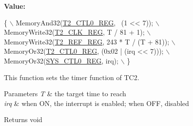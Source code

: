 {\bfseries Value\+:}
\begin{DoxyCode}
\{                                                  \(\backslash\)
        MemoryAnd32(\mbox{\hyperlink{a00026_a5853553391e986211306d4f29ab31e47}{T2\_CTL0\_REG}}, ~(1 << 7));           \(\backslash\)
        MemoryWrite32(\mbox{\hyperlink{a00026_adaf93e89c438f05ea402aee531c0ac3b}{T2\_CLK\_REG}}, T / 81 + 1);             \(\backslash\)
        MemoryWrite32(\mbox{\hyperlink{a00026_afc6a4a26e5276c1e4fe1b3fe26e70984}{T2\_REF\_REG}}, 243 * T / (T + 81)); \(\backslash\)
        MemoryOr32(\mbox{\hyperlink{a00026_a5853553391e986211306d4f29ab31e47}{T2\_CTL0\_REG}}, (0x02 | (irq << 7)));  \(\backslash\)
        MemoryOr32(\mbox{\hyperlink{a00026_ab34acec79daf4fcc12a662cde9e75df7}{SYS\_CTL0\_REG}}, irq);                 \(\backslash\)
    \}
\end{DoxyCode}


This function sets the timer function of T\+C2. 


\begin{DoxyParams}{Parameters}
{\em T} & the target time to reach \\
\hline
{\em irq} & when ON, the interrupt is enabled; when O\+FF, disabled \\
\hline
\end{DoxyParams}
\begin{DoxyReturn}{Returns}
void 
\end{DoxyReturn}
